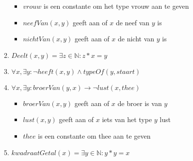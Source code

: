 \documentclass[]{article}
\begin{document}
\begin{enumerate}[a]
\begin{enumerate}[i]
      \begin{itemize}
        \item $vrouw$ is een constante om het type vrouw aan te geven
        \item $neefVan(x,y)$ geeft aan of $x$ de neef van $y$ is
        \item $nichtVan(x,y)$ geeft aan of $x$ de nicht van $y$ is
      \end{itemize}
      \item $Deelt(x,y) = \exists z \in \mathbb{N}: z * x = y$
      \item $ \forall x, \exists y: \neg heeft(x,y) \land typeOf(y,staart) $
      \item $ \forall x, \exists y: broerVan(y,x) \longrightarrow \neg lust(x,thee) $
      \begin{itemize}
        \item $broerVan(x,y)$ geeft aan of $x$ de broer is van $y$
        \item $lust(x,y)$ geeft aan of $x$ iets van het type $y$ lust
        \item $thee$ is een constante om thee aan te geven
      \end{itemize}
      \item $kwadraatGetal(x) = \exists y \in \mathbb{N}: y*y = x $
    \end{enumerate}


\end{enumerate}
\end{document}
